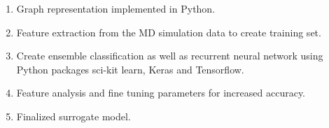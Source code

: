 \begin{enumerate}

\item {Graph representation implemented in Python.}
\item {Feature extraction from the MD simulation data to create training set.} 
\item {Create ensemble classification  as well as recurrent neural network using Python packages sci-kit learn, Keras and Tensorflow.} 
\item {Feature analysis and fine tuning parameters for increased accuracy.} 
\item {Finalized surrogate model.}
        
\end{enumerate}









